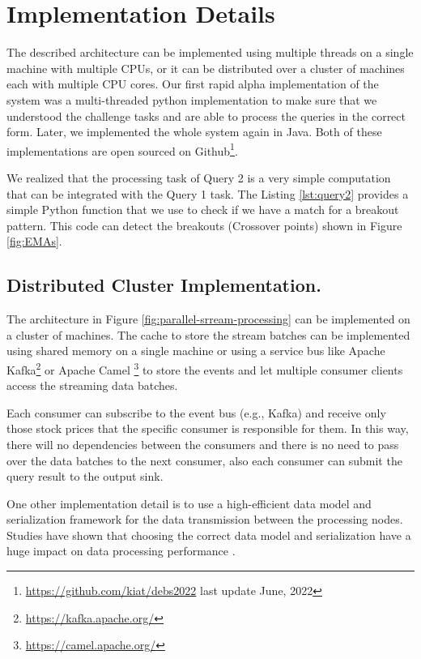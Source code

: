     

\section{Implementation Details}\label{sec:implementation}
The described architecture can be implemented using multiple threads on a single machine with multiple CPUs, or it can be distributed over a cluster of machines each with multiple CPU cores. 
Our first rapid alpha implementation of the system was a multi-threaded python implementation to make sure that we understood the challenge tasks and are able to process the queries in the correct form.
Later, we implemented the whole system again in Java. Both of these implementations are open sourced on Github\footnote{\url{https://github.com/kiat/debs2022} last update June, 2022}. 


We realized that the processing task of Query 2 is a very simple computation that can be integrated with the Query 1 task.
The Listing \ref{lst:query2} provides a simple Python function that we use to check if we have a match for a breakout pattern.
This code can detect the breakouts (Crossover points) shown in Figure \ref{fig:EMAs}.



\subsection{Distributed Cluster Implementation.}
The architecture in Figure \ref{fig:parallel-srream-processing} can be implemented on a cluster of machines. The cache to store the stream batches can be implemented using shared memory on a single machine or using a service bus like Apache Kafka\footnote{\url{https://kafka.apache.org/}} or Apache Camel \footnote{\url{https://camel.apache.org/}} to store
the events and let multiple consumer clients access the streaming data batches.

Each consumer can subscribe to the event bus (e.g., Kafka) and receive only those stock prices that the specific consumer is responsible
for them. In this way, there will no dependencies between the consumers and there is no need to pass over the data batches to the next
consumer, also each consumer can submit the query result to the output sink.

One other implementation detail is to use a high-efficient data model and serialization framework for the data transmission between
the processing nodes. Studies have shown that choosing the correct data model and serialization have a huge impact on data processing performance \cite{DBLP:conf/cloud/SikdarTJ17}.

